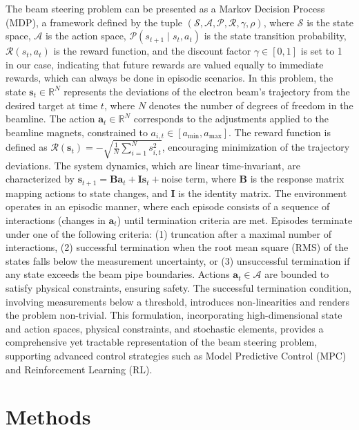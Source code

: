 \documentclass[journal,article,submit,pdftex,moreauthors]{Definitions/mdpi}
\begin{document}
The beam steering problem can be presented as a Markov Decision Process (MDP), a framework defined by the tuple $(\mathcal{S}, \mathcal{A}, \mathcal{P}, \mathcal{R}, \gamma, \rho)$, where $\mathcal{S}$ is the state space, $\mathcal{A}$ is the action space, $\mathcal{P}(s_{t+1} \mid s_t, a_t)$ is the state transition probability, $\mathcal{R}(s_t, a_t)$ is the reward function, and the discount factor $\gamma \in [0,1]$  is set to 1 in our case, indicating that future rewards are valued equally to immediate rewards, which can always be done in episodic scenarios. In this problem, the state $\mathbf{s}_t \in \mathbb{R}^N$ represents the deviations of the electron beam's trajectory from the desired target at time $t$, where $N$ denotes the number of degrees of freedom in the beamline. The action $\mathbf{a}_t \in \mathbb{R}^N$ corresponds to the adjustments applied to the beamline magnets, constrained to $a_{i,t} \in [a_{\text{min}}, a_{\text{max}}]$. The reward function is defined as $\mathcal{R}(\mathbf{s}_t) = -\sqrt{\frac{1}{N} \sum_{i=1}^N s_{i,t}^2}$, encouraging minimization of the trajectory deviations. The system dynamics, which are linear time-invariant, are characterized by $\mathbf{s}_{t+1} = \mathbf{B} \mathbf{a}_t + \mathbf{I} \mathbf{s}_t + \text{noise term}$, where $\mathbf{B}$ is the response matrix mapping actions to state changes, and $\mathbf{I}$ is the identity matrix. The environment operates in an episodic manner, where each episode consists of a sequence of interactions (changes in $\mathbf{a}_t$) until termination criteria are met. Episodes terminate under one of the following criteria: (1) truncation after a maximal number of interactions, (2) successful termination when the root mean square (RMS) of the states falls below the measurement uncertainty, or (3) unsuccessful termination if any state exceeds the beam pipe boundaries. Actions $\mathbf{a}_t \in \mathcal{A}$ are bounded to satisfy physical constraints, ensuring safety. The successful termination condition, involving measurements below a threshold, introduces non-linearities and renders the problem non-trivial. This formulation, incorporating high-dimensional state and action spaces, physical constraints, and stochastic elements, provides a comprehensive yet tractable representation of the beam steering problem, supporting advanced control strategies such as Model Predictive Control (MPC) and Reinforcement Learning (RL).



\section{Methods}
\end{document}
